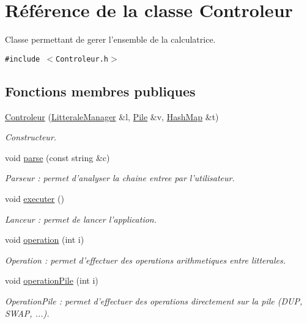 \hypertarget{class_controleur}{
\section{Référence de la classe Controleur}
\label{class_controleur}
}
Classe permettant de gerer l'ensemble de la calculatrice.  


{\tt \#include $<$Controleur.h$>$}

\subsection*{Fonctions membres publiques}
\begin{CompactItemize}
\item 
\hyperlink{class_controleur_b5ba4bff7cacbe4aaaa7f926cfb638f0}{Controleur} (\hyperlink{class_litterale_manager}{LitteraleManager} \&l, \hyperlink{class_pile}{Pile} \&v, \hyperlink{class_hash_map}{HashMap} \&t)
\begin{CompactList}\small\item\em Constructeur. \item\end{CompactList}\item 
void \hyperlink{class_controleur_3b3ae1907bbec700443d18ebed7c4131}{parse} (const string \&c)
\begin{CompactList}\small\item\em Parseur : permet d'analyser la chaine entree par l'utilisateur. \item\end{CompactList}\item 
\hypertarget{class_controleur_040d1f47fea94b243efc6040b0c105c0}{
void \hyperlink{class_controleur_040d1f47fea94b243efc6040b0c105c0}{executer} ()}
\label{class_controleur_040d1f47fea94b243efc6040b0c105c0}

\begin{CompactList}\small\item\em Lanceur : permet de lancer l'application. \item\end{CompactList}\item 
void \hyperlink{class_controleur_0b31c80009731bc370277e3ce62b6df7}{operation} (int i)
\begin{CompactList}\small\item\em Operation : permet d'effectuer des operations arithmetiques entre litterales. \item\end{CompactList}\item 
void \hyperlink{class_controleur_59c48ea6ab32a447c665ca1b7c220f8f}{operationPile} (int i)
\begin{CompactList}\small\item\em OperationPile : permet d'effectuer des operations directement sur la pile (DUP, SWAP, ...). \item\end{CompactList}\end{CompactItemize}
